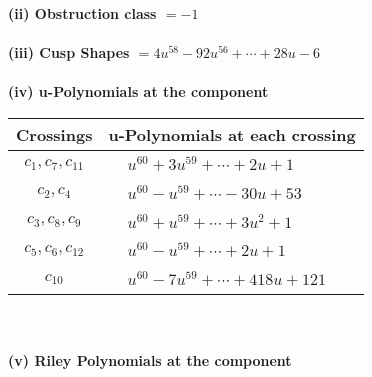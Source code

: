 \documentclass[1p]{elsarticle_modified}
\theoremstyle{definition}
\begin{document}
\flushleft \textbf{(ii) Obstruction class $= -1$}\\~\\
\flushleft \textbf{(iii) Cusp Shapes $= 4 u^{58}-92 u^{56}+\cdots+28 u-6$}\\~\\
\newpage\renewcommand{\arraystretch}{1}
\flushleft \textbf{(iv) u-Polynomials at the component}\newline \\
\begin{tabular}{m{50pt}|m{274pt}}
Crossings & \hspace{64pt}u-Polynomials at each crossing \\
\hline $$\begin{aligned}c_{1},c_{7},c_{11}\end{aligned}$$&$\begin{aligned}
&u^{60}+3 u^{59}+\cdots+2 u+1
\end{aligned}$\\
\hline $$\begin{aligned}c_{2},c_{4}\end{aligned}$$&$\begin{aligned}
&u^{60}- u^{59}+\cdots-30 u+53
\end{aligned}$\\
\hline $$\begin{aligned}c_{3},c_{8},c_{9}\end{aligned}$$&$\begin{aligned}
&u^{60}+u^{59}+\cdots+3 u^2+1
\end{aligned}$\\
\hline $$\begin{aligned}c_{5},c_{6},c_{12}\end{aligned}$$&$\begin{aligned}
&u^{60}- u^{59}+\cdots+2 u+1
\end{aligned}$\\
\hline $$\begin{aligned}c_{10}\end{aligned}$$&$\begin{aligned}
&u^{60}-7 u^{59}+\cdots+418 u+121
\end{aligned}$\\
\hline
\end{tabular}\\~\\
\newpage\renewcommand{\arraystretch}{1}
\flushleft \textbf{(v) Riley Polynomials at the component}\newline \\
\end{document}
